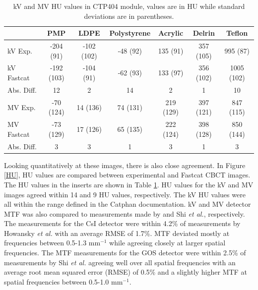 \begin{table}[]
\caption{kV and MV HU values in CTP404 module, values are in HU while standard deviations are in parentheses.
}
\label{table}
\begin{center}
\begin{tabular}{|l|c|c|c|c|c|c|}
\hline
                & PMP        & LDPE       & Polystyrene & Acrylic   & Delrin    & Teflon     \\ \hline
kV Exp.     & -204 (91)  & -102 (102) & -48 (92)    & 135 (91)  & 357 (105) & 995 (87)   \\ \hline
kV Fastcat  & -192 (103) & -104 (91)  & -62 (93)    & 133 (97)  & 356 (102) & 1005 (102) \\ \hline
Abs. Diff.  & 12         & 2          & 14          & 2         & 1         & 10         \\ \hline
MV Exp.     & -70 (124)  & 14 (136)   & 74 (131)    & 219 (129) & 397 (121) & 847 (115)  \\ \hline
MV Fastcat  & -73 (129)  & 17 (126)   & 65 (135)    & 222 (124) & 398 (128) & 850 (144)  \\ \hline
Abs. Diff.  & 3          & 3          & 1           & 3         & 1         & 3          \\ \hline
\end{tabular}
\end{center}
\vspace{10mm}
\end{table}


Looking quantitatively at these images, there is also close agreement. In Figure \ref{HU}, HU values are compared between experimental and Fastcat CBCT images. The HU values in the inserts are shown in Table \ref{table}. HU values for the kV and MV images agreed within 14 and 9 HU values, respectively. The kV HU values were all within the range defined in the Catphan documentation. kV and MV detector MTF was also compared to measurements made by  and Shi \textit{et al.}, respectively. The measurements for the CsI detector were within 4.2\% of measurements by Howansky \textit{et al.} with an average RMSE of 1.7\%. MTF deviated mostly at frequencies between 0.5-1.3 mm$^{-1}$ while agreeing closely at larger spatial frequencies. The MTF measurements for the GOS detector were within 2.5\% of  measurements by Shi \textit{et al.} agreeing well over all spatial frequencies with an average root mean squared error (RMSE) of 0.5\% and a slightly higher MTF at spatial frequencies between 0.5-1.0 mm$^{-1}$.

